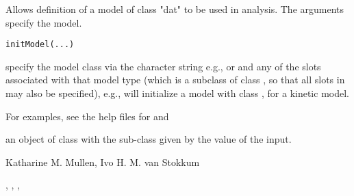 \begin{Description}\relax
Allows definition of a model of class "dat" to be used 
in analysis.  The arguments specify the model.
\end{Description}
\begin{Usage}
\begin{verbatim}
initModel(...)
\end{verbatim}
\end{Usage}
\begin{Arguments}
\begin{ldescription}
\item[\code{...}] specify the model class via the character string
e.g.,  or  and 
any of the slots associated with that model type (which is 
a subclass of class , so that all slots in  
may also be specified),   
e.g.,  will initialize a model with 
class , for a kinetic model.  
\end{ldescription}
\end{Arguments}
\begin{Details}\relax
For examples, see the help files for  and 
\end{Details}
\begin{Value}
an object of class  with the sub-class given by the value of 
the  input.
\end{Value}
\begin{Author}\relax
Katharine M. Mullen, Ivo H. M. van Stokkum
\end{Author}
\begin{SeeAlso}\relax
{}, , 
, 
\end{SeeAlso}

